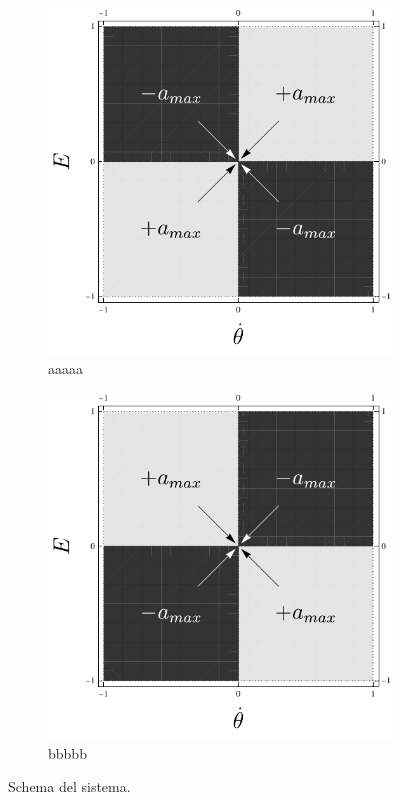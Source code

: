 \begin{figure}
    \centering
    \begin{subfigure}[b]{0.48\textwidth}
        \centering
        \includegraphics[width=\textwidth]{assets/energy-control1}
        \caption{aaaaa}
    \end{subfigure}
    \hfill
    \begin{subfigure}[b]{0.48\textwidth}
        \centering
        \includegraphics[width=\textwidth]{assets/energy-control2}
        \caption{bbbbb}
    \end{subfigure}
    \caption{Schema del sistema.} %
    \label{fig:energy-control}
\end{figure}

